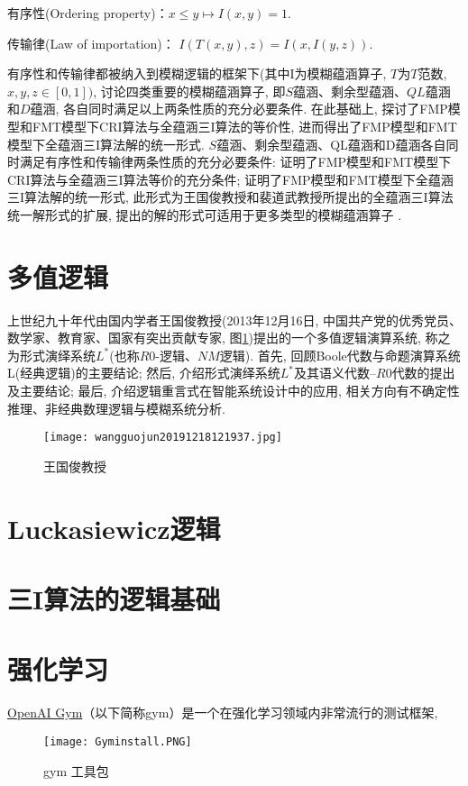 有序性(Ordering property)：$ x\leq y\longmapsto I(x,y)=1$.

传输律(Law of importation)： $I(T(x,y),z)=I(x,I(y,z))$.

有序性和传输律都被纳入到模糊逻辑的框架下(其中I为模糊蕴涵算子, $T$为$T$范数, $x,y,z\in [0,1])$, 讨论四类重要的模糊蕴涵算子, 即$S$蕴涵、剩余型蕴涵、$QL$蕴涵和$D$蕴涵, 各自同时满足以上两条性质的充分必要条件. 在此基础上, 探讨了FMP模型和FMT模型下CRI算法与全蕴涵三I算法的等价性, 进而得出了FMP模型和FMT模型下全蕴涵三I算法解的统一形式.
$S$蕴涵、剩余型蕴涵、QL蕴涵和D蕴涵各自同时满足有序性和传输律两条性质的充分必要条件: 证明了FMP模型和FMT模型下CRI算法与全蕴涵三I算法等价的充分条件; 证明了FMP模型和FMT模型下全蕴涵三I算法解的统一形式, 此形式为王国俊教授和裴道武教授所提出的全蕴涵三I算法统一解形式的扩展, 提出的解的形式可适用于更多类型的模糊蕴涵算子 .
\section{多值逻辑}
上世纪九十年代由国内学者王国俊教授(2013年12月16日, 中国共产党的优秀党员、数学家、教育家、国家有突出贡献专家, 图\ref{wangguojun20191218121937})提出的一个多值逻辑演算系统, 称之为形式演绎系统$L^*$(也称$R0$-逻辑、$NM$逻辑). 首先, 回顾Boole代数与命题演算系统L(经典逻辑)的主要结论; 然后, 介绍形式演绎系统$L^*$及其语义代数--$R0$代数的提出及主要结论; 最后, 介绍逻辑重言式在智能系统设计中的应用, 相关方向有不确定性推理、非经典数理逻辑与模糊系统分析.
\begin{figure}[H]
\centering
\texttt{[image: wangguojun20191218121937.jpg]}
\caption{王国俊教授}
\label{wangguojun20191218121937}
\end{figure}
\section{Luckasiewicz逻辑}
\section{三I算法的逻辑基础}
\section{强化学习}
\href{https://gym.openai.com/}{OpenAI Gym}（以下简称gym）是一个在强化学习领域内非常流行的测试框架,
\begin{figure}[H]
\centering
\texttt{[image: Gyminstall.PNG]}
\caption{gym 工具包}
\label{Gyminstall}
\end{figure}

